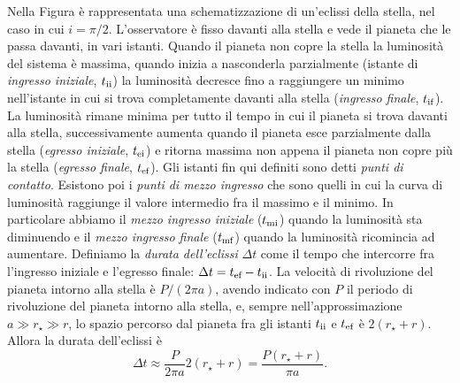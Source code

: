 Nella Figura %
è rappresentata una schematizzazione di un'eclissi della stella, nel caso in cui
$i = \pi/2$. L'osservatore è fisso davanti alla stella e vede il pianeta che le
passa davanti, in vari istanti. Quando il pianeta non copre la stella la
luminosità del sistema è massima, quando inizia a nasconderla parzialmente
(istante di \emph{ingresso iniziale}, $t_{\textup{ii}}$) la luminosità decresce
fino a raggiungere un minimo nell'istante in cui si trova completamente davanti
alla stella (\emph{ingresso finale}, $t_{\textup{if}}$). La luminosità rimane
minima per tutto il tempo in cui il pianeta si trova davanti alla stella,
successivamente aumenta quando il pianeta esce parzialmente dalla stella
(\emph{egresso iniziale}, $t_{\textup{ei}}$) e ritorna massima non appena il
pianeta non copre più la stella (\emph{egresso finale}, $t_{\textup{ef}}$). Gli
istanti fin qui definiti sono detti \emph{punti di contatto}. Esistono poi i
\emph{punti di mezzo ingresso} che sono quelli in cui la curva di luminosità
raggiunge il valore intermedio fra il massimo e il minimo. In particolare
abbiamo il \emph{mezzo ingresso iniziale} ($t_{\textup{mi}}$) quando la
luminosità sta diminuendo e il \emph{mezzo ingresso finale} ($t_{\textup{mf}}$)
quando la luminosità ricomincia ad aumentare. Definiamo la
\emph{durata dell'eclissi} $\Delta t$ come il tempo che intercorre fra
l'ingresso iniziale e l'egresso finale:
$\Delta t = t_{\textup{ef}} - t_{\textup{ii}}$. La velocità di rivoluzione del
pianeta intorno alla stella è $P/(2\pi a)$, avendo indicato con $P$ il periodo
di rivoluzione del pianeta intorno alla stella, e, sempre nell'approssimazione
$a \gg r_\star \gg r$, lo spazio percorso dal pianeta fra gli istanti
$t_{\textup{ii}}$ e $t_{\textup{ef}}$ è $2(r_\star + r)$. Allora la durata
dell'eclissi è
\begin{equation}
  \Delta t \approx \frac{P}{2\pi a}2(r_\star + r) = \frac{P(r_\star + r)}{\pi
    a}.
\end{equation}

